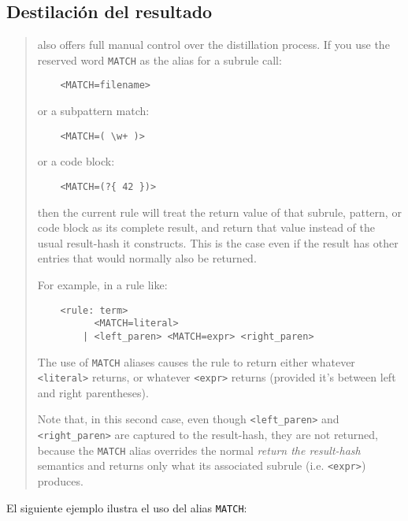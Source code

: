 \subsection{Destilación del resultado}


\begin{it}\begin{quotation}
 also offers full manual control over the distillation
process. If you use the reserved word \verb|MATCH| as the alias for a subrule
call:

\begin{verbatim}
    <MATCH=filename>
\end{verbatim}

or a subpattern match:

\begin{verbatim}
    <MATCH=( \w+ )>
\end{verbatim}

or a code block:

\begin{verbatim}
    <MATCH=(?{ 42 })>
\end{verbatim}

then the current rule will treat the return value of that subrule,
pattern, or code block as its complete result, and return that value
instead of the usual result-hash it constructs. This is the case even
if the result has other entries that would normally also be returned.

For example, in a rule like:

\begin{verbatim}
    <rule: term>
          <MATCH=literal>
        | <left_paren> <MATCH=expr> <right_paren>
\end{verbatim}

The use of \verb|MATCH| aliases causes the rule to return either whatever
\verb|<literal>| returns, or whatever \verb|<expr>| returns (provided it's between
left and right parentheses).

Note that, in this second case, even though \verb|<left_paren>| and \verb|<right_paren>|
are captured to the result-hash, they are not returned, because the
\verb|MATCH| alias overrides the normal \emph{return the result-hash} semantics and
returns only what its associated subrule (i.e. \verb|<expr>|) produces.
\end{quotation}\end{it}

El siguiente ejemplo ilustra el uso del alias \verb|MATCH|:

